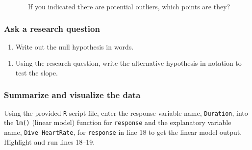 \documentclass[
]{report}
\newenvironment{Shaded}{\begin{snugshade}}{\end{snugshade}}
\newcommand{\AttributeTok}[1]{\textcolor[rgb]{0.77,0.63,0.00}{#1}}
\newcommand{\CommentTok}[1]{\textcolor[rgb]{0.56,0.35,0.01}{\textit{#1}}}
\newcommand{\DecValTok}[1]{\textcolor[rgb]{0.00,0.00,0.81}{#1}}
\newcommand{\FunctionTok}[1]{\textcolor[rgb]{0.00,0.00,0.00}{#1}}
\newcommand{\NormalTok}[1]{#1}
\newcommand{\OtherTok}[1]{\textcolor[rgb]{0.56,0.35,0.01}{#1}}
\newcommand{\SpecialCharTok}[1]{\textcolor[rgb]{0.00,0.00,0.00}{#1}}
\providecommand{\tightlist}{%
  \setlength{\itemsep}{0pt}\setlength{\parskip}{0pt}}
\begin{document}
~~~~~~~If you indicated there are potential outliers, which points are they?

\vspace{0.5in}

\hypertarget{ask-a-research-question-5}{%
\subsubsection*{Ask a research question}\label{ask-a-research-question-5}}

\begin{enumerate}
\def\labelenumi{\arabic{enumi}.}
\setcounter{enumi}{4}
\tightlist
\item
  Write out the null hypothesis in words.
\end{enumerate}

\vspace{1in}

\begin{enumerate}
\def\labelenumi{\arabic{enumi}.}
\setcounter{enumi}{5}
\tightlist
\item
  Using the research question, write the alternative hypothesis in notation to test the slope.
\end{enumerate}

\vspace{0.5in}

\hypertarget{summarize-and-visualize-the-data-5}{%
\subsubsection*{Summarize and visualize the data}\label{summarize-and-visualize-the-data-5}}

Using the provided \texttt{R} script file, enter the response variable name, \texttt{Duration}, into the \texttt{lm()} (linear model) function for \texttt{response} and the explanatory variable name, \texttt{Dive\_HeartRate}, for \texttt{response} in line 18 to get the linear model output. Highlight and run lines 18--19.

\begin{Shaded}
\end{Shaded}
\end{document}

